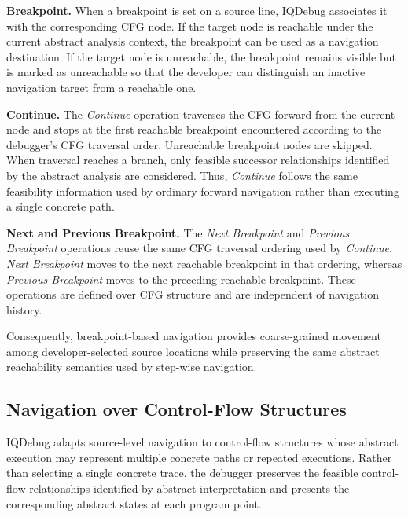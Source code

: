 \documentclass[11pt,oneside]{report}
\theoremstyle{plain}
\theoremstyle{definition}
\theoremstyle{remark}
\begin{document}
\smallskip
\noindent\textbf{Breakpoint.}
When a breakpoint is set on a source line, IQDebug associates it with the corresponding CFG node.
If the target node is reachable under the current abstract analysis context, the breakpoint can be used as a navigation destination.
If the target node is unreachable, the breakpoint remains visible but is marked as unreachable so that the developer can distinguish an inactive navigation target from a reachable one.

\smallskip
\noindent\textbf{Continue.}
The \textit{Continue} operation traverses the CFG forward from the current node and stops at the first reachable breakpoint encountered according to the debugger's CFG traversal order.
Unreachable breakpoint nodes are skipped.
When traversal reaches a branch, only feasible successor relationships identified by the abstract analysis are considered.
Thus, \textit{Continue} follows the same feasibility information used by ordinary forward navigation rather than executing a single concrete path.

\smallskip
\noindent\textbf{Next and Previous Breakpoint.}
The \textit{Next Breakpoint} and \textit{Previous Breakpoint} operations reuse the same CFG traversal ordering used by \textit{Continue}.
\textit{Next Breakpoint} moves to the next reachable breakpoint in that ordering, whereas \textit{Previous Breakpoint} moves to the preceding reachable breakpoint.
These operations are defined over CFG structure and are independent of navigation history.

Consequently, breakpoint-based navigation provides coarse-grained movement among developer-selected source locations while preserving the same abstract reachability semantics used by step-wise navigation.

\subsection{Navigation over Control-Flow Structures}
\label{subsec:design:navigation-control-flow}
IQDebug adapts source-level navigation to control-flow structures whose abstract execution may represent multiple concrete paths or repeated executions. Rather than selecting a single concrete trace, the debugger preserves the feasible control-flow relationships identified by abstract interpretation and presents the corresponding abstract states at each program point.
\end{document}
